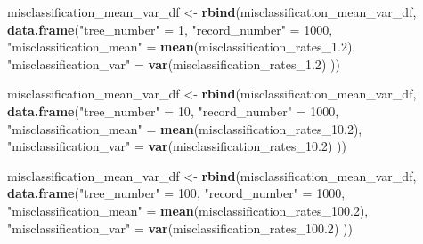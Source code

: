 \documentclass[
]{article}
\newenvironment{Shaded}{\begin{snugshade}}{\end{snugshade}}
\newcommand{\DecValTok}[1]{\textcolor[rgb]{0.00,0.00,0.81}{#1}}
\newcommand{\FloatTok}[1]{\textcolor[rgb]{0.00,0.00,0.81}{#1}}
\newcommand{\FunctionTok}[1]{\textcolor[rgb]{0.13,0.29,0.53}{\textbf{#1}}}
\newcommand{\NormalTok}[1]{#1}
\newcommand{\OtherTok}[1]{\textcolor[rgb]{0.56,0.35,0.01}{#1}}
\newcommand{\StringTok}[1]{\textcolor[rgb]{0.31,0.60,0.02}{#1}}
\begin{document}
\begin{Shaded}
\begin{Highlighting}[]
\NormalTok{misclassification\_mean\_var\_df }\OtherTok{\textless{}{-}} \FunctionTok{rbind}\NormalTok{(misclassification\_mean\_var\_df, }
                                      \FunctionTok{data.frame}\NormalTok{(}\StringTok{"tree\_number"} \OtherTok{=} \DecValTok{1}\NormalTok{, }
                                                 \StringTok{"record\_number"} \OtherTok{=} \DecValTok{1000}\NormalTok{,}
                                                 \StringTok{"misclassification\_mean"} \OtherTok{=} \FunctionTok{mean}\NormalTok{(misclassification\_rates\_1}\FloatTok{.2}\NormalTok{),}
                                                 \StringTok{"misclassification\_var"} \OtherTok{=} \FunctionTok{var}\NormalTok{(misclassification\_rates\_1}\FloatTok{.2}\NormalTok{)}
\NormalTok{                                                 ))}

\NormalTok{misclassification\_mean\_var\_df }\OtherTok{\textless{}{-}} \FunctionTok{rbind}\NormalTok{(misclassification\_mean\_var\_df, }
                                      \FunctionTok{data.frame}\NormalTok{(}\StringTok{"tree\_number"} \OtherTok{=} \DecValTok{10}\NormalTok{, }
                                                 \StringTok{"record\_number"} \OtherTok{=} \DecValTok{1000}\NormalTok{,}
                                                 \StringTok{"misclassification\_mean"} \OtherTok{=} \FunctionTok{mean}\NormalTok{(misclassification\_rates\_10}\FloatTok{.2}\NormalTok{),}
                                                 \StringTok{"misclassification\_var"} \OtherTok{=} \FunctionTok{var}\NormalTok{(misclassification\_rates\_10}\FloatTok{.2}\NormalTok{)}
\NormalTok{                                                 ))}

\NormalTok{misclassification\_mean\_var\_df }\OtherTok{\textless{}{-}} \FunctionTok{rbind}\NormalTok{(misclassification\_mean\_var\_df, }
                                      \FunctionTok{data.frame}\NormalTok{(}\StringTok{"tree\_number"} \OtherTok{=} \DecValTok{100}\NormalTok{, }
                                                 \StringTok{"record\_number"} \OtherTok{=} \DecValTok{1000}\NormalTok{,}
                                                 \StringTok{"misclassification\_mean"} \OtherTok{=} \FunctionTok{mean}\NormalTok{(misclassification\_rates\_100}\FloatTok{.2}\NormalTok{),}
                                                 \StringTok{"misclassification\_var"} \OtherTok{=} \FunctionTok{var}\NormalTok{(misclassification\_rates\_100}\FloatTok{.2}\NormalTok{)}
\NormalTok{                                                 ))}


\end{Highlighting}
\end{Shaded}
\end{document}

